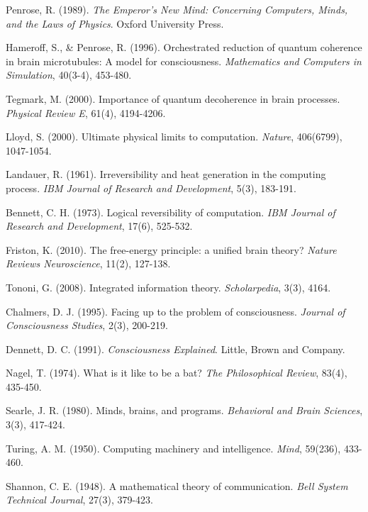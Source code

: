\documentclass[12pt]{article}
\begin{document}
\begin{thebibliography}{99}

Penrose, R. (1989). \textit{The Emperor's New Mind: Concerning Computers, Minds, and the Laws of Physics}. Oxford University Press.

Hameroff, S., \& Penrose, R. (1996). Orchestrated reduction of quantum coherence in brain microtubules: A model for consciousness. \textit{Mathematics and Computers in Simulation}, 40(3-4), 453-480.

Tegmark, M. (2000). Importance of quantum decoherence in brain processes. \textit{Physical Review E}, 61(4), 4194-4206.

Lloyd, S. (2000). Ultimate physical limits to computation. \textit{Nature}, 406(6799), 1047-1054.

Landauer, R. (1961). Irreversibility and heat generation in the computing process. \textit{IBM Journal of Research and Development}, 5(3), 183-191.

Bennett, C. H. (1973). Logical reversibility of computation. \textit{IBM Journal of Research and Development}, 17(6), 525-532.

Friston, K. (2010). The free-energy principle: a unified brain theory? \textit{Nature Reviews Neuroscience}, 11(2), 127-138.

Tononi, G. (2008). Integrated information theory. \textit{Scholarpedia}, 3(3), 4164.

Chalmers, D. J. (1995). Facing up to the problem of consciousness. \textit{Journal of Consciousness Studies}, 2(3), 200-219.

Dennett, D. C. (1991). \textit{Consciousness Explained}. Little, Brown and Company.

Nagel, T. (1974). What is it like to be a bat? \textit{The Philosophical Review}, 83(4), 435-450.

Searle, J. R. (1980). Minds, brains, and programs. \textit{Behavioral and Brain Sciences}, 3(3), 417-424.

Turing, A. M. (1950). Computing machinery and intelligence. \textit{Mind}, 59(236), 433-460.

Shannon, C. E. (1948). A mathematical theory of communication. \textit{Bell System Technical Journal}, 27(3), 379-423.


\end{thebibliography}
\end{document}
